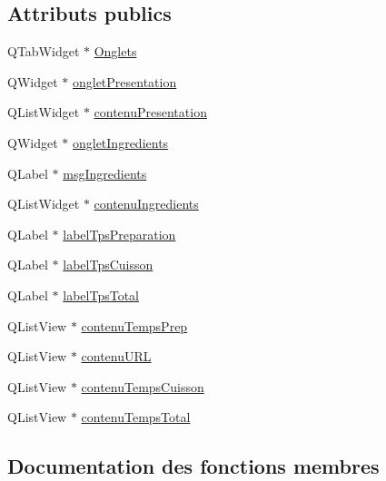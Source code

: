 \subsection*{Attributs publics}
\begin{DoxyCompactItemize}
\item 
Q\+Tab\+Widget $\ast$ \hyperlink{class_ui___fenetre_presentation_a5ada401c3f50deda8794ad915e047707}{Onglets}
\item 
Q\+Widget $\ast$ \hyperlink{class_ui___fenetre_presentation_a6569025596a4f21aad52d42c4c0cde3d}{onglet\+Presentation}
\item 
Q\+List\+Widget $\ast$ \hyperlink{class_ui___fenetre_presentation_a15b1c966591fea35f2769207cfa21a0e}{contenu\+Presentation}
\item 
Q\+Widget $\ast$ \hyperlink{class_ui___fenetre_presentation_ade5aa5e1df3a3f800400499917077fb2}{onglet\+Ingredients}
\item 
Q\+Label $\ast$ \hyperlink{class_ui___fenetre_presentation_a6bd65740a513271b28bbd9e72f05df01}{msg\+Ingredients}
\item 
Q\+List\+Widget $\ast$ \hyperlink{class_ui___fenetre_presentation_a35b6dfdfa4899c487169582542e5b3e0}{contenu\+Ingredients}
\item 
Q\+Label $\ast$ \hyperlink{class_ui___fenetre_presentation_aa7aae419a87c0248c735670010e2a38a}{label\+Tps\+Preparation}
\item 
Q\+Label $\ast$ \hyperlink{class_ui___fenetre_presentation_ace7dcf1ffe9dbab894494f4b0bbdaa48}{label\+Tps\+Cuisson}
\item 
Q\+Label $\ast$ \hyperlink{class_ui___fenetre_presentation_a9bf87a50c0a4ee15739d7800c777614b}{label\+Tps\+Total}
\item 
Q\+List\+View $\ast$ \hyperlink{class_ui___fenetre_presentation_a90bdc54b6b901eb9aae58ef440bc8963}{contenu\+Temps\+Prep}
\item 
Q\+List\+View $\ast$ \hyperlink{class_ui___fenetre_presentation_ad266b41d115254cbe73186a30dee0d12}{contenu\+U\+RL}
\item 
Q\+List\+View $\ast$ \hyperlink{class_ui___fenetre_presentation_a3efaca6db5e151ffbd20f7cad1f94dfb}{contenu\+Temps\+Cuisson}
\item 
Q\+List\+View $\ast$ \hyperlink{class_ui___fenetre_presentation_a1665db8ec6e2cf652f7de55d0deac678}{contenu\+Temps\+Total}
\end{DoxyCompactItemize}


\subsection{Documentation des fonctions membres}
\mbox{\label{class_ui___fenetre_presentation_a14a00db87b3b4ce5a1e3df9f754e19bb}} 
